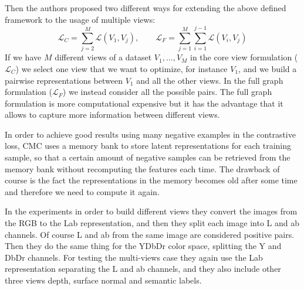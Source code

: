 Then the authors proposed two different ways for extending the above defined framework to the usage of multiple views:
\[ \mathcal{L}_C = \sum_{j=2}^{M} \mathcal{L}(V_1, V_j), \qquad \mathcal{L}_F = \sum_{j=1}^{M} \sum_{i=1}^{j-1} \mathcal{L}(V_i, V_j)\]
If we have $M$ different views of a dataset $V_1, \dots, V_M$ in the core view formulation ($\mathcal{L}_C$) we select one view that we want to optimize, for instance $V_1$, and we build a pairwise representations between $V_1$ and all the other views. In the full graph formulation ($\mathcal{L}_F$) we instead consider all the possible pairs. The full graph formulation is more computational expensive but it has the advantage that it allows to capture more information between different views.

In order to achieve good results using many negative examples in the contrastive loss, CMC uses a memory bank to store latent representations for each training sample, so that a certain amount of negative samples can be retrieved from the memory bank without recomputing the features each time. The drawback of course is the fact the representations in the memory becomes old after some time and therefore we need to compute it again.

In the experiments in order to build different views they convert the images from the RGB to the Lab representation, and then they split each image into L and ab channels. Of course L and ab from the same image are considered positive pairs. Then they do the same thing for the YDbDr color space, splitting the Y and DbDr channels. For testing the multi-views case they again use the Lab representation separating the L and ab channels, and they also include other three views depth, surface normal and semantic labels.